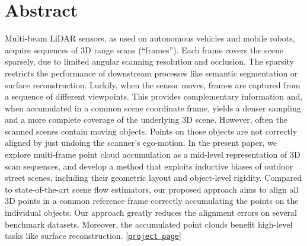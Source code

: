 \section*{Abstract}
Multi-beam LiDAR sensors, as used on autonomous vehicles and mobile robots, acquire sequences of 3D range scans (``frames''). Each frame covers the scene sparsely, due to limited angular scanning resolution and occlusion. The sparsity restricts the performance of downstream processes like semantic segmentation or surface reconstruction. Luckily, when the sensor moves, frames are captured from a sequence of different viewpoints. This provides complementary information and, when accumulated in a common scene coordinate frame, yields a denser sampling and a more complete coverage of the underlying 3D scene. However, often the scanned scenes contain moving objects. Points on those objects are not correctly aligned by just undoing the scanner's ego-motion. In the present paper, we explore multi-frame point cloud accumulation as a mid-level representation of 3D scan sequences, and develop a method that exploits inductive biases of outdoor street scenes, including their geometric layout and object-level rigidity. Compared to state-of-the-art scene flow estimators, our proposed approach aims to align all 3D points in a common reference frame correctly accumulating the points on the individual objects. Our approach greatly reduces the alignment errors on several benchmark datasets. Moreover, the accumulated point clouds benefit high-level tasks like surface reconstruction. [\href{shengyuh.github.io/eccv22/index.html}{\texttt{project page}}]  
